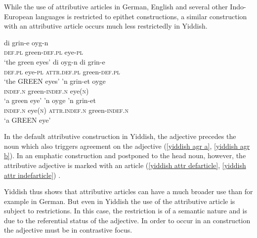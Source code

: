 While the use of attributive articles in German, English and several other Indo-European languages is restricted to epithet constructions, a similar construction with an attributive article occurs much less restrictedly in Yiddish.
\begin{exe}
\ex
{}\label{yiddish attr appos}
\begin{xlist}
\ex 
\gll 	di grin-e oyg-n\\
	\textsc{def.pl}	green-\textsc{def.pl} eye-\textsc{pl}\\
\glt	‘the green eyes’\label{yiddish agr a}
\ex
\gll 	di oyg-n di grin-e\\
	\textsc{def.pl} eye-\textsc{pl} \textsc{attr.def.pl} green-\textsc{def.pl}\\
\glt	‘the GREEN eyes’\label{yiddish attr defarticle}
\ex	
\gll	'n grin-et oyge\\
	\textsc{indef.n} green-\textsc{indef.n} eye(\textsc{n})\\
\glt	‘a green eye’\label{yiddish agr b}
\ex	
\gll	'n oyge 'n grin-et\\
	\textsc{indef.n} eye(\textsc{n}) \textsc{attr.indef.n} green-\textsc{indef.n}\\
\glt	‘a GREEN eye’\label{yiddish attr indefarticle}
\end{xlist}
\end{exe}
In the default attributive construction in Yiddish, the adjective precedes the noun which also triggers agreement on the adjective (\ref{yiddish agr a}, \ref{yiddish agr b}). In an emphatic construction and postponed to the head noun, however, the attributive adjective is marked with an article (\ref{yiddish attr defarticle}, \ref{yiddish attr indefarticle}) \citep[342–347]{plank2003}.

Yiddish thus shows that attributive articles can have a much broader use than for example in German. But even in Yiddish the use of the attributive article is subject to restrictions. In this case, the restriction is of a semantic nature and is due to the referential status of the adjective. In order to occur in an  construction the adjective must be in contrastive focus.

